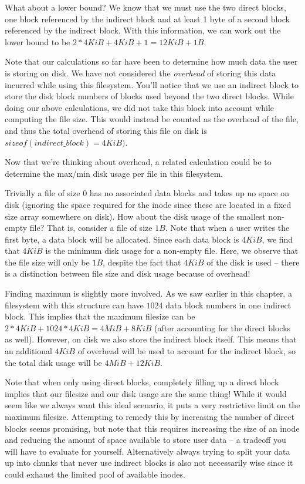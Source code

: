 What about a lower bound? We know that we must use the two direct blocks, one block referenced by the indirect block and at least 1 byte of a
second block referenced by the indirect block.
With this information, we can work out the lower bound to be $2*4KiB+4KiB+1=12KiB+1B$.

Note that our calculations so far have been to determine how much data the user is storing on disk.
We have not considered the \textit{overhead} of storing this data incurred while using this filesystem.
You'll notice that we use an indirect block to store the disk block numbers of blocks used beyond the two direct blocks.
While doing our above calculations, we did not take this block into account while computing the file size.
This would instead be counted as the overhead of the file, and thus the total overhead of storing this file on disk is $sizeof(indirect\_block)=4KiB)$.

Now that we're thinking about overhead, a related calculation could be to determine the max/min disk usage per file in this filesystem.

Trivially a file of size $0$ has no associated data blocks and takes up no space on disk (ignoring the space required for the inode since these are located in a fixed size array somewhere on disk).
How about the disk usage of the smallest non-empty file? That is, consider a file of size $1B$.
Note that when a user writes the first byte, a data block will be allocated.
Since each data block is $4KiB$, we find that $4KiB$ is the minimum disk usage for a non-empty file.
Here, we observe that the file size will only be $1B$, despite the fact that $4KiB$ of the disk is used -- there is a distinction between file size and disk usage because of overhead!

Finding maximum is slightly more involved.
As we saw earlier in this chapter, a filesystem with this structure can have $1024$ data block numbers in one indirect block.
This implies that the maximum filesize can be $2*4KiB + 1024*4KiB = 4MiB + 8KiB$ (after accounting for the direct blocks as well).
However, on disk we also store the indirect block itself.
This means that an additional $4KiB$ of overhead will be used to account for the indirect block, so the total disk usage will be $4MiB + 12KiB$.

Note that when only using direct blocks, completely filling up a direct block implies that our filesize and our disk usage are the same thing!
While it would seem like we always want this ideal scenario, it puts a very restrictive limit on the maximum filesize.
Attempting to remedy this by increasing the number of direct blocks seems promising, but note that this requires increasing the size of an inode and reducing the amount of space available to store user data -- a tradeoff you will have to evaluate for yourself.
Alternatively always trying to split your data up into chunks that never use indirect blocks is also not necessarily wise since it could exhaust the limited pool of available inodes.


